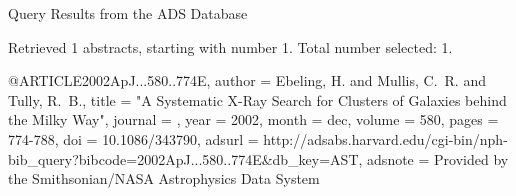 Query Results from the ADS Database


Retrieved 1 abstracts, starting with number 1.  Total number selected: 1.

@ARTICLE{2002ApJ...580..774E,
   author = {{Ebeling}, H. and {Mullis}, C.~R. and {Tully}, R.~B.},
    title = "{A Systematic X-Ray Search for Clusters of Galaxies behind the Milky Way}",
  journal = {\apj},
     year = 2002,
    month = dec,
   volume = 580,
    pages = {774-788},
      doi = {10.1086/343790},
   adsurl = {http://adsabs.harvard.edu/cgi-bin/nph-bib_query?bibcode=2002ApJ...580..774E&db_key=AST},
  adsnote = {Provided by the Smithsonian/NASA Astrophysics Data System}
}


